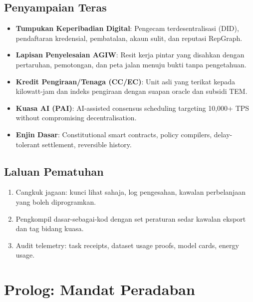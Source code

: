 \documentclass[11pt]{article}
\begin{document}
\subsection{Penyampaian Teras}
\begin{itemize}[noitemsep]
  \item \textbf{Tumpukan Keperibadian Digital}: Pengecam terdesentralisasi (DID), pendaftaran kredensial, pembatalan, akaun sulit, dan reputasi RepGraph.
  \item \textbf{Lapisan Penyelesaian AGIW}: Resit kerja pintar yang disahkan dengan pertaruhan, pemotongan, dan peta jalan menuju bukti tanpa pengetahuan.
  \item \textbf{Kredit Pengiraan/Tenaga (CC/EC)}: Unit asli yang terikat kepada kilowatt-jam dan indeks pengiraan dengan suapan oracle dan subsidi TEM.
  \item \textbf{Kuasa AI (PAI)}: AI-assisted consensus scheduling targeting 10,000+ TPS without compromising decentralisation.
  \item \textbf{Enjin Dasar}: Constitutional smart contracts, policy compilers, delay-tolerant settlement, reversible history.
\end{itemize}

\subsection{Laluan Pematuhan}
\begin{enumerate}[noitemsep]
  \item Cangkuk jagaan: kunci lihat sahaja, log pengesahan, kawalan perbelanjaan yang boleh diprogramkan.
  \item Pengkompil dasar-sebagai-kod dengan set peraturan sedar kawalan eksport dan tag bidang kuasa.
  \item Audit telemetry: task receipts, dataset usage proofs, model cards, energy usage.
\end{enumerate}

\section{Prolog: Mandat Peradaban}
\end{document}
